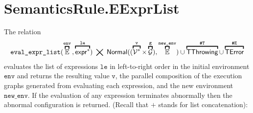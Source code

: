 \documentclass{book}
\newcommand\eqname[0]{\stackrel{\mathsmaller{\mathsf{name}}}{=}}
\newcommand\overname[2]{\overbracket{#1}^{#2}}
\newcommand\xgraph[0]{\textsf{g}}
\newcommand\emptygraph[0]{{\emptyset}_\xgraph}
\newcommand\XGraphs[0]{\mathcal{G}}
\newcommand\vals[0]{\mathcal{V}}
\newcommand\evalarrow[0]{\stackrel{\mathsf{asl}}{\rightsquigarrow}}
\newcommand\aslrel[0]{\bigtimes}
\newcommand\aslsep[0]{\mathbf{,}}
\newcommand\sslash[0]{\mathbin{/\mkern-6mu/}}
\newcommand\terminateas[0]{\;\sslash\;}
\newcommand\ThrowingConfig[0]{\texttt{\#T}}
\newcommand\ErrorConfig[0]{\texttt{\#E}}
\newcommand\OrAbnormal[0]{\terminateas \ThrowingConfig, \ErrorConfig}
\newcommand\TError[0]{\textsf{TError}}
\newcommand\TThrowing[0]{\textsf{TThrowing}}
\newcommand\evalexpr[1]{\texttt{eval\_expr}(#1)}
\newcommand\evalexprlist[1]{\texttt{eval\_expr\_list}(#1)}
\newcommand\Normal[0]{\textsf{Normal}}
\newcommand\newenv[0]{\texttt{new\_env}}
\newcommand\env[0]{\texttt{env}}
\newcommand\envp[0]{\texttt{env'}}
\newcommand\ve[0]{\texttt{e}}
\newcommand\vg[0]{\texttt{g}}
\newcommand\vv[0]{\texttt{v}}
\newcommand\vvs[0]{\texttt{vs}}
\newcommand\vle[0]{\texttt{le}}
\newcommand\vvone[0]{\texttt{v1}}
\newcommand\vgone[0]{\texttt{g1}}
\newcommand\vgtwo[0]{\texttt{g2}}
\begin{document}
\section{SemanticsRule.EExprList \label{sec:SemanticsRule.EExprList}}
The relation
\[
  \evalexprlist{\overname{\envs}{\env} \aslsep \overname{\expr^*}{\vle}} \;\aslrel\;
  \Normal((\overname{\vals^*}{\vv} \times \overname{\XGraphs}{\vg})\aslsep \overname{\envs}{\newenv}) \cup
  \overname{\TThrowing}{\ThrowingConfig} \cup \overname{\TError}{\ErrorConfig}
\]
evaluates the list of expressions $\vle$ in left-to-right order in the initial environment $\env$
and returns the resulting value $\vv$, the parallel composition of the execution graphs
generated from evaluating each expression, and the new environment $\newenv$.
If the evaluation of any expression terminates abnormally then the abnormal configuration is returned.
(Recall that $+$ stands for list concatenation):
\end{document}
